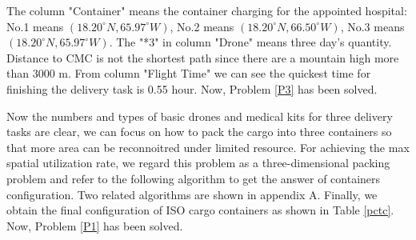 \documentclass{mcmthesis}
\begin{document}
	The column "Container" means the container charging for the appointed hospital: No.1 means $(18.20^\circ N, 65.97^\circ W)$, No.2 means $(18.20^\circ N, 66.50^\circ W)$, No.3 means $(18.20^\circ N, 65.97^\circ W)$. The "*3" in column "Drone" means three day's quantity. Distance to CMC is not the shortest path since there are a mountain high more than 3000 m. From column "Flight Time" we can see the quickest time for finishing the delivery task is 0.55 hour. \textcolor[rgb]{1.00,0.00,0.00}{Now, Problem \ref{P3} has been solved.}
	   
	Now the numbers and types of basic drones and medical kits for three delivery tasks are clear, we can focus on how to pack the cargo into three containers so that more area can be reconnoitred under limited resource. For achieving the max spatial utilization rate, we regard this problem as a three-dimensional packing problem and refer to the following algorithm \cite{6} to get the answer of containers configuration. Two related algorithms are shown in appendix A. Finally, we obtain the final configuration of ISO cargo containers as shown in Table \ref{pctc}.  \textcolor[rgb]{1.00,0.00,0.00}{Now, Problem \ref{P1} has been solved.}
%			
	
%			
\end{document}

